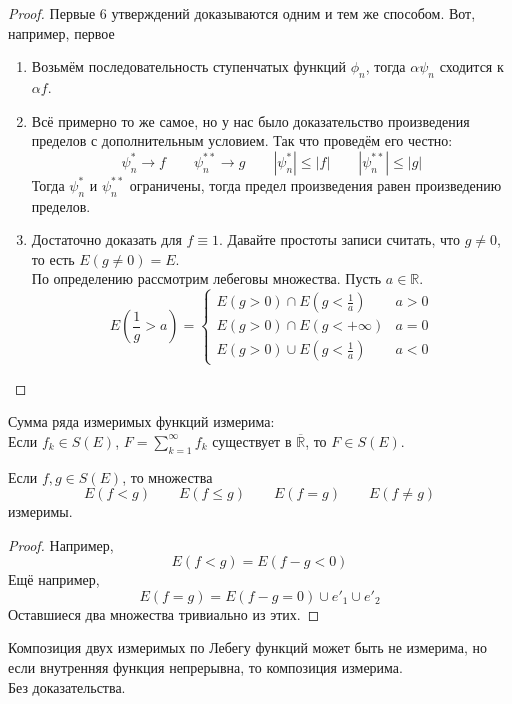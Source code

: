 \documentclass{article}
\begin{document}
    \begin{proof}
        Первые 6 утверждений доказываются одним и тем же способом. Вот, например, первое
        \begin{enumerate}
            \item Возьмём последовательность ступенчатых функций $\phi_n$, тогда $\alpha\psi_n$ сходится к $\alpha f$.
            \addtocounter{enumi}{4}
            \item Всё примерно то же самое, но у нас было доказательство произведения пределов с дополнительным условием. Так что проведём его честно:
            $$
            \psi^*_n\to f\qquad\psi^{**}_n\to g\qquad |\psi^*_n|\leqslant|f|\qquad |\psi^{**}_n|\leqslant|g|
            $$
            Тогда $\psi^*_n$ и $\psi^{**}_n$ ограничены, тогда предел произведения равен произведению пределов.
            \item Достаточно доказать для $f\equiv1$. Давайте простоты записи считать, что $g\neq0$, то есть $E(g\neq0)=E$.\\
            По определению рассмотрим лебеговы множества. Пусть $a\in\mathbb R$.
            $$
            E\left(\frac1g>a\right)=\begin{cases}
                E(g>0)\cap E\left(g<\frac1a\right) & a>0\\
                E(g>0)\cap E\left(g<+\infty\right) & a=0\\
                E(g>0)\cup E\left(g<\frac1a\right) & a<0
            \end{cases}
            $$
        \end{enumerate}
    \end{proof}
    \begin{corollary}
        Сумма ряда измеримых функций измерима:\\
        Если $f_k\in S(E)$, $F=\sum\limits_{k=1}^\infty f_k$ существует в $\overline{\mathbb R}$, то $F\in S(E)$.
    \end{corollary}
    \begin{corollary}
        Если $f,g\in S(E)$, то множества
        $$
        E(f<g)\qquad E(f\leqslant g)\qquad E(f=g)\qquad E(f\neq g)
        $$
        измеримы.
    \end{corollary}
    \begin{proof}
        Например,
        $$E(f<g)=E(f-g<0)$$
        Ещё например,
        $$
        E(f=g)=E(f-g=0)\cup e'_1\cup e'_2
        $$
        Оставшиеся два множества тривиально из этих.
    \end{proof}
    \begin{claim}
        Композиция двух измеримых по Лебегу функций может быть не измерима, но если внутренняя функция непрерывна, то композиция измерима.\\
        Без доказательства.
    \end{claim}
\end{document}
